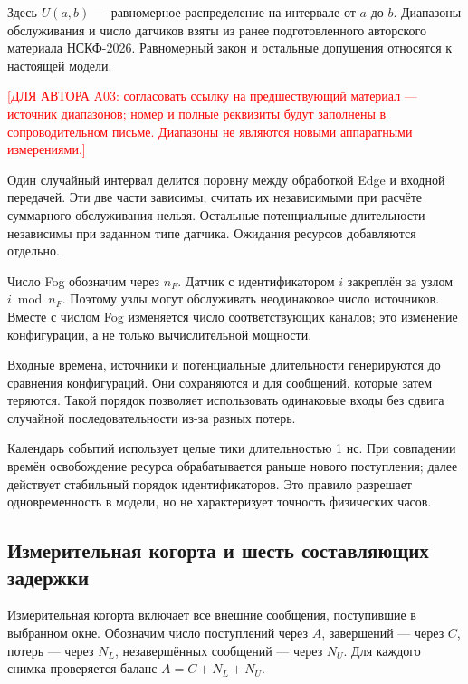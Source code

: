 Здесь \(U(a,b)\) --- равномерное распределение на интервале от \(a\) до \(b\). Диапазоны обслуживания и число датчиков взяты из ранее подготовленного авторского материала НСКФ-2026. Равномерный закон и остальные допущения относятся к настоящей модели.

\textcolor{red}{{[}ДЛЯ АВТОРА A03: согласовать ссылку на предшествующий материал --- источник диапазонов; номер и полные реквизиты будут заполнены в сопроводительном письме. Диапазоны не являются новыми аппаратными измерениями.{]}}

Один случайный интервал делится поровну между обработкой Edge и входной передачей. Эти две части зависимы; считать их независимыми при расчёте суммарного обслуживания нельзя. Остальные потенциальные длительности независимы при заданном типе датчика. Ожидания ресурсов добавляются отдельно.

Число Fog обозначим через \(n_F\). Датчик с идентификатором \(i\) закреплён за узлом \(i\bmod n_F\). Поэтому узлы могут обслуживать неодинаковое число источников. Вместе с числом Fog изменяется число соответствующих каналов; это изменение конфигурации, а не только вычислительной мощности.

Входные времена, источники и потенциальные длительности генерируются до сравнения конфигураций. Они сохраняются и для сообщений, которые затем теряются. Такой порядок позволяет использовать одинаковые входы без сдвига случайной последовательности из-за разных потерь.

Календарь событий использует целые тики длительностью 1 нс. При совпадении времён освобождение ресурса обрабатывается раньше нового поступления; далее действует стабильный порядок идентификаторов. Это правило разрешает одновременность в модели, но не характеризует точность физических часов.

\hypertarget{ux438ux437ux43cux435ux440ux438ux442ux435ux43bux44cux43dux430ux44f-ux43aux43eux433ux43eux440ux442ux430-ux438-ux448ux435ux441ux442ux44c-ux441ux43eux441ux442ux430ux432ux43bux44fux44eux449ux438ux445-ux437ux430ux434ux435ux440ux436ux43aux438}{%
\subsection{Измерительная когорта и шесть составляющих задержки}}

Измерительная когорта включает все внешние сообщения, поступившие в выбранном окне. Обозначим число поступлений через \(A\), завершений --- через \(C\), потерь --- через \(N_L\), незавершённых сообщений --- через \(N_U\). Для каждого снимка проверяется баланс \(A=C+N_L+N_U\).

